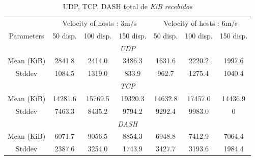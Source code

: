 \documentclass[12pt]{article}
\begin{document}
    \begin{table}[h!] 
  \centering
  \caption{UDP, TCP, DASH total de \textit{KiB recebidos}}
  \begin{tabular}{c|ccc|ccc}
    \hline
    \multicolumn{1}{c}{} & \multicolumn{3}{c}{Velocity of hosts : 3m/s} & \multicolumn{3}{c}{Velocity of hosts : 6m/s} 			\\ 
    Parameters             & 50 disp.      & 100 disp.     & 150 disp.     &   50 disp.      & 100 disp.     & 150 disp.     		\\ 
    \hline
    \hline
    \multicolumn{7}{c}{\textit{UDP}} \\
    \hline
    \hline
    Mean (KiB) & 2841.8    & 2414.0   & 3486.3    & 1631.6  & 2220.2    &  1997.6  \\
    Stddev       & 1084.5   & 1319.0   & 833.9   & 962.7  & 1275.4    &  1040.4  \\
    \hline
    \hline
    \multicolumn{7}{c}{\textit{TCP}} \\
    \hline
    \hline
    Mean (KiB) & 14281.6    & 15769.5   & 19320.3    &  	14632.8 & 17457.0    &  14436.9  \\
    Stddev       & 7463.3   & 8435.2   & 9794.2   & 9292.4  & 9983.0    &  0  \\
    \hline
    \hline
    \multicolumn{7}{c}{\textit{DASH}} \\
    \hline
    \hline
    Mean (KiB) &  	6071.7   &  	9056.5   & 8854.3    &  	6948.8 & 7412.9    &  7064.4  \\
    Stddev       & 2387.6   & 3254.0   & 1743.9  & 3427.7  & 3193.6    &  1984.4 \\
    \hline
  \end{tabular}
  \label{tab:tabletotal}
\end{table}
\end{document}
